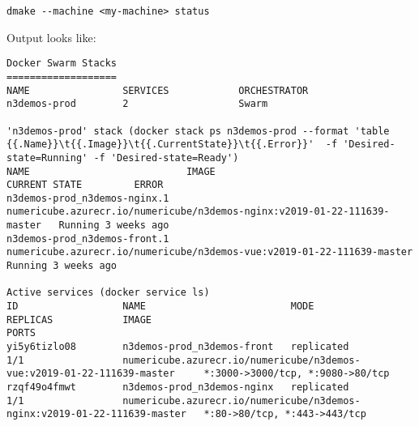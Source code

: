 \begin{lstlisting}[style=console]
dmake --machine <my-machine> status
\end{lstlisting}

Output looks like:

\begin{lstlisting}[style=console]
Docker Swarm Stacks
===================
NAME                SERVICES            ORCHESTRATOR
n3demos-prod        2                   Swarm

'n3demos-prod' stack (docker stack ps n3demos-prod --format 'table {{.Name}}\t{{.Image}}\t{{.CurrentState}}\t{{.Error}}'  -f 'Desired-state=Running' -f 'Desired-state=Ready')
NAME                           IMAGE                                                                      CURRENT STATE         ERROR
n3demos-prod_n3demos-nginx.1   numericube.azurecr.io/numericube/n3demos-nginx:v2019-01-22-111639-master   Running 3 weeks ago
n3demos-prod_n3demos-front.1   numericube.azurecr.io/numericube/n3demos-vue:v2019-01-22-111639-master     Running 3 weeks ago

Active services (docker service ls)
ID                  NAME                         MODE                REPLICAS            IMAGE                                                                      PORTS
yi5y6tizlo08        n3demos-prod_n3demos-front   replicated          1/1                 numericube.azurecr.io/numericube/n3demos-vue:v2019-01-22-111639-master     *:3000->3000/tcp, *:9080->80/tcp
rzqf49o4fmwt        n3demos-prod_n3demos-nginx   replicated          1/1                 numericube.azurecr.io/numericube/n3demos-nginx:v2019-01-22-111639-master   *:80->80/tcp, *:443->443/tcp
\end{lstlisting}
